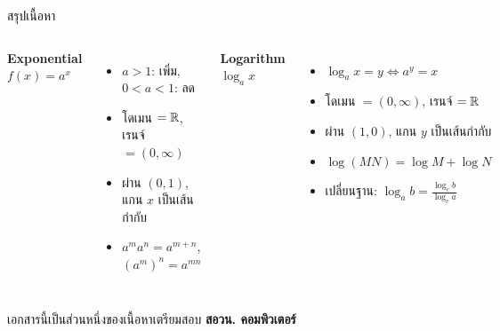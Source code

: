 \documentclass[11pt, aspectratio=169]{beamer}
\begin{document}
\begin{frame}{สรุปเนื้อหา}
  \begin{explanation}[สิ่งที่ได้เรียนรู้]
    \begin{columns}[T]
        \textbf{Exponential $f(x) = a^x$}
        \begin{itemize}
          \item $a > 1$: เพิ่ม, $0 < a < 1$: ลด
          \item โดเมน $= \mathbb{R}$, เรนจ์ $= (0, \infty)$
          \item ผ่าน $(0,1)$, แกน $x$ เป็นเส้นกำกับ
          \item $a^m a^n = a^{m+n}$, $(a^m)^n = a^{mn}$
        \end{itemize}
        \textbf{Logarithm $\log_a x$}
        \begin{itemize}
          \item $\log_a x = y \iff a^y = x$
          \item โดเมน $= (0, \infty)$, เรนจ์ $= \mathbb{R}$
          \item ผ่าน $(1,0)$, แกน $y$ เป็นเส้นกำกับ
          \item $\log(MN) = \log M + \log N$
          \item เปลี่ยนฐาน: $\log_a b = \frac{\log_c b}{\log_c a}$
        \end{itemize}
    \end{columns}

    \medskip
    \begin{center}
    \end{center}
  \end{explanation}
  \begin{center}
    \large เอกสารนี้เป็นส่วนหนึ่งของเนื้อหาเตรียมสอบ \textbf{สอวน. คอมพิวเตอร์}
  \end{center}
\end{frame}
\end{document}
